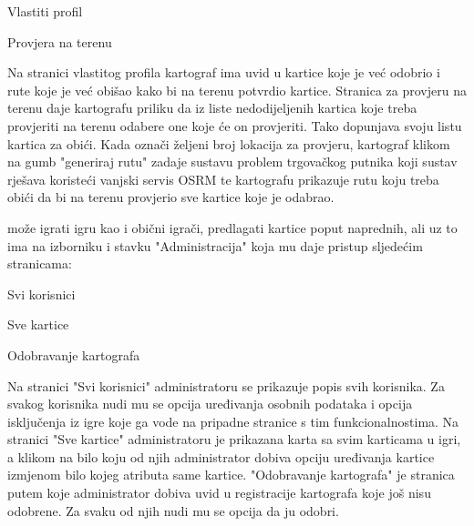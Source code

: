 		\begin{packed_item}
		    \item Vlastiti profil
		    \item Provjera na terenu
		\end{packed_item}
		
		Na stranici vlastitog profila kartograf ima uvid u kartice koje je već odobrio i rute koje je već obišao kako bi na terenu potvrdio kartice. Stranica za provjeru na terenu daje kartografu priliku da iz liste nedodijeljenih kartica koje treba provjeriti na terenu odabere one koje će on provjeriti. Tako dopunjava svoju listu kartica za obići. Kada označi željeni broj lokacija za provjeru, kartograf klikom na gumb "generiraj rutu" zadaje sustavu problem trgovačkog putnika koji sustav rješava koristeći vanjski servis OSRM te kartografu prikazuje rutu koju treba obići da bi na terenu provjerio sve kartice koje je odabrao.
		
		 može igrati igru kao i obični igrači, predlagati kartice poput naprednih, ali uz to ima na izborniku i stavku "Administracija" koja mu daje pristup sljedećim stranicama:
		
		\begin{packed_item}
		    \item Svi korisnici
		    \item Sve kartice
		    \item Odobravanje kartografa
		\end{packed_item}
		
		Na stranici "Svi korisnici" administratoru se prikazuje popis svih korisnika. Za svakog korisnika nudi mu se opcija uređivanja osobnih podataka i opcija isključenja iz igre koje ga vode na pripadne stranice s tim funkcionalnostima. Na stranici "Sve kartice" administratoru je prikazana karta sa svim karticama u igri, a klikom na bilo koju od njih administrator dobiva opciju uređivanja kartice izmjenom bilo kojeg atributa same kartice. "Odobravanje kartografa" je stranica putem koje administrator dobiva uvid u registracije kartografa koje još nisu odobrene. Za svaku od njih nudi mu se opcija da ju odobri.
		
		
